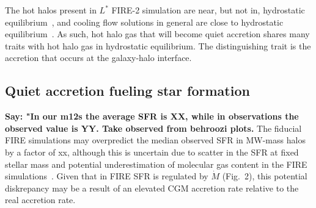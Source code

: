 \documentclass[fleqn,usenatbib]{mnras}
\newcommand{\Mdot}{\dot{M}}
\begin{document}
The hot halos present in $L^*$ FIRE-2 simulation are near, but not in, hydrostatic equilibrium~\citep{Esmerian2020, Stern2020}, and cooling flow solutions in general are close to hydrostatic equilibrium~\citep{Stern2019}.
As such, hot halo gas that will become quiet accretion shares many traits with hot halo gas in hydrostatic equilibrium.
The distinguishing trait is the accretion that occurs at the galaxy-halo interface.

\subsection{Quiet accretion fueling star formation}
\label{s: fueling}


\textbf{Say: "In our m12s the average SFR is XX, while in observations the observed value is YY. Take observed from behroozi plots.}
The fiducial FIRE simulations may overpredict the median observed SFR in MW-mass halos by a factor of xx, although this is uncertain due to scatter in the SFR at fixed stellar mass and potential underestimation of molecular gas content in the FIRE simulations~\citep{Sparre2017, Orr2018}.
Given that in FIRE SFR is regulated by $\Mdot$ (Fig.~2), this potential diskrepancy may be a result of an elevated CGM accretion rate relative to the real accretion rate.
\end{document}
